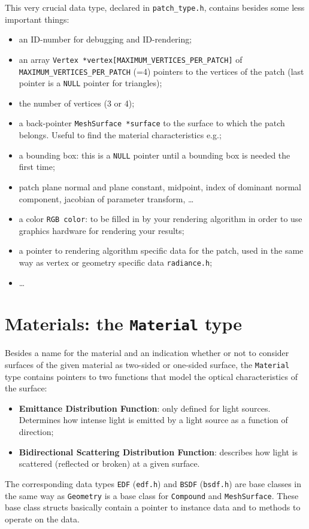 \documentclass[11pt]{report}
\begin{document}
This very crucial data type, declared in {\tt patch\_type.h}, contains
besides some less important things:
\begin{itemize}
\item   an ID-number for debugging and ID-rendering;
\item   an array {\tt Vertex *vertex[MAXIMUM_VERTICES_PER_PATCH]}
        of {\tt MAXIMUM_VERTICES_PER_PATCH} (=4) pointers to the vertices of
        the patch (last pointer is a {\tt NULL} pointer for triangles);
\item   the number of vertices (3 or 4);
\item   a back-pointer {\tt MeshSurface *surface} to the surface to which the
  patch belongs. Useful to find the material characteristics e\@.g\@.;
\item   a bounding box: this is a {\tt NULL} pointer until a bounding box
  is needed the first time;
\item   patch plane normal and plane constant, midpoint, index of dominant
  normal component, jacobian of parameter transform, \ldots
\item   a color {\tt RGB color}: to be filled in by your rendering algorithm
  in order to use graphics hardware for rendering your results;
\item   a pointer to rendering algorithm specific data for the patch, used
  in the same way as vertex or geometry specific data {\tt radiance.h};
\item   \ldots
\end{itemize}

\section{Materials: the {\tt Material} type}
\label{material}

Besides a name for the material and an indication whether or not to consider
surfaces of the given material as two-sided or one-sided surface, the
{\tt Material} type contains pointers to
two functions that model the optical characteristics of the surface:
\begin{itemize}
\item {\bf Emittance Distribution Function}: only defined for light sources.
  Determines how intense light is emitted by a light source as a function
  of direction;
\item {\bf Bidirectional Scattering Distribution Function}: describes
  how light is scattered (reflected or broken) at a given surface.
\end{itemize}
The corresponding data types {\tt EDF} ({\tt edf.h}) and
{\tt BSDF} ({\tt bsdf.h}) are base classes
in the same way as {\tt Geometry} is a base class for {\tt Compound} and
{\tt MeshSurface}. These base class structs basically contain a pointer to
instance data and to methods to operate on the data.
\end{document}
